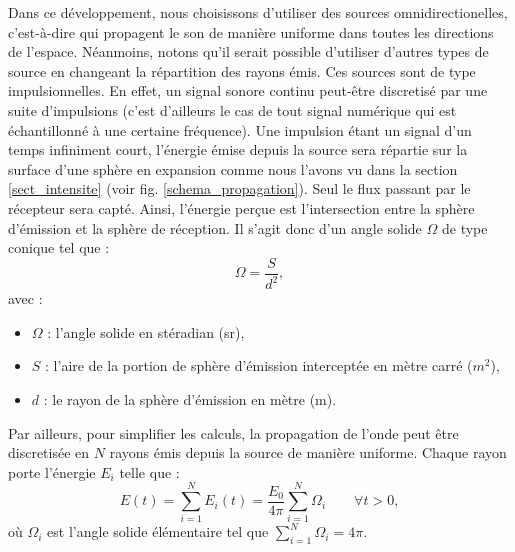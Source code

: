 Dans ce développement, nous choisissons d'utiliser des sources omnidirectionelles, c'est-à-dire qui propagent le son de manière uniforme dans toutes les directions de l'espace. Néanmoins, notons qu'il serait possible d'utiliser d'autres types de source en changeant la répartition des rayons émis. Ces sources sont de type impulsionnelles. En effet, un signal sonore continu peut-être discretisé par une suite d'impulsions (c'est d'ailleurs le cas de tout signal numérique qui est échantillonné à une certaine fréquence). Une impulsion étant un signal d'un temps infiniment court, l'énergie émise depuis la source sera répartie sur la surface d'une sphère en expansion comme nous l'avons vu dans la section \ref{sect_intensite} (voir fig. \ref{schema_propagation}). Seul le flux passant par le récepteur sera capté. Ainsi, l'énergie perçue est l'intersection entre la sphère d'émission et la sphère de réception. Il s'agit donc d'un angle solide $\Omega$ de type conique tel que :
%
\begin{equation}
\Omega =\frac{S}{d^2},
\end{equation}
avec  :
\begin{itemize}
\item $\Omega$ : l'angle solide en stéradian (sr),
\item $S$ : l'aire de la portion de sphère d'émission interceptée en mètre carré ($m^2$),
\item $d$ : le rayon de la sphère d'émission en mètre (m).
\end{itemize}
%
Par ailleurs, pour simplifier les calculs, la propagation de l'onde peut être discretisée en $N$ rayons émis depuis la source de manière uniforme. Chaque rayon porte l'énergie $E_i$ telle que :
%
\begin{equation}
E(t) = \sum_{i=1}^N E_i(t) = \frac{E_0}{4\pi}  \sum_{i=1}^N \Omega_i  \qquad \forall t > 0,
\end{equation}
où  $\Omega_i$ est l'angle solide élémentaire tel que $ \sum_{i=1}^N \Omega_i = 4\pi$. \\


